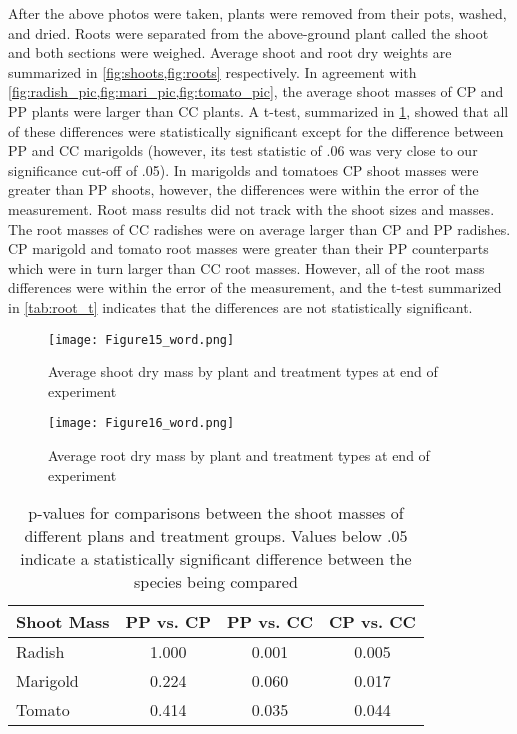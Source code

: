 After the above photos were taken, plants were removed from their pots, washed, and dried.  Roots were separated from the above-ground plant called the shoot and both sections were weighed.  Average shoot and root dry weights are summarized in \cref{fig:shoots,fig:roots} respectively.  In agreement with \cref{fig:radish_pic,fig:mari_pic,fig:tomato_pic}, the average shoot masses of CP and PP plants were larger than CC plants.  A t-test, summarized in \cref{tab:shoot_t}, showed that all of these differences were statistically significant except for the difference between PP and CC marigolds (however, its test statistic of .06 was very close to our significance cut-off of .05).  In marigolds and tomatoes CP shoot masses were greater than PP shoots, however, the differences were within the error of the measurement.  Root mass results did not track with the shoot sizes and masses.  The root masses of CC radishes were on average larger than CP and PP radishes. CP marigold and tomato root masses were greater than their PP counterparts which were in turn larger than CC root masses.  However, all of the root mass differences were within the error of the measurement, and the t-test summarized in \cref{tab:root_t} indicates that the differences are not statistically significant.

\begin{figure}[htbp]
  \centering
  \texttt{[image: Figure15\_word.png]}
  \caption{Average shoot dry mass by plant and treatment types at end of experiment}
  \label{fig:shoots}
\end{figure}

\begin{figure}[htbp]
  \centering
  \texttt{[image: Figure16\_word.png]}
  \caption{Average root dry mass by plant and treatment types at end of experiment}
  \label{fig:roots}
\end{figure}

\begin{table}[htpb]
  \begin{center}
    \begin{tabular}{|l |c |c |c |}
      \hline
      Shoot Mass & PP vs. CP & PP vs. CC & CP vs. CC \\\hline
      Radish & 1.000 & 0.001 & 0.005 \\\hline
      Marigold & 0.224 & 0.060 & 0.017 \\\hline
      Tomato & 0.414 & 0.035 & 0.044 \\\hline
    \end{tabular}
  \end{center}
  \caption{p-values for comparisons between the shoot masses of different plans and treatment groups. Values below .05 indicate a statistically significant difference between the species being compared}
  \label{tab:shoot_t}
\end{table}

